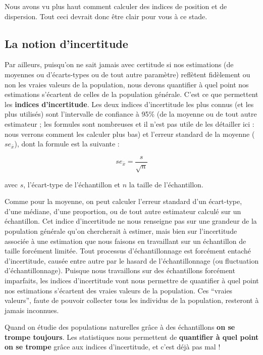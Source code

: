 \documentclass[
  a4paper,
  DIV=11,
  numbers=noendperiod,
  oneside]{scrreprt}
\begin{document}
Nous avons vu plus haut comment calculer des indices de position et de
dispersion. Tout ceci devrait donc être clair pour vous à ce stade.

\hypertarget{la-notion-dincertitude}{%
\subsection{La notion d'incertitude}\label{la-notion-dincertitude}}

Par ailleurs, puisqu'on ne sait jamais avec certitude si nos estimations
(de moyennes ou d'écarts-types ou de tout autre paramètre) reflètent
fidèlement ou non les vraies valeurs de la population, nous devons
quantifier à quel point nos estimations s'écartent de celles de la
population générale. C'est ce que permettent les \textbf{indices
d'incertitude}. Les deux indices d'incertitude les plus connus (et les
plus utilisés) sont l'intervalle de confiance à 95\% (de la moyenne ou
de tout autre estimateur ; les formules sont nombreuses et il n'est pas
utile de les détailler ici : nous verrons comment les calculer plus bas)
et l'erreur standard de la moyenne (\(se_{\bar{x}}\)), dont la formule
est la suivante :

\[se_{\bar{x}} = \frac{s}{\sqrt{n}}\]

avec \(s\), l'écart-type de l'échantillon et \(n\) la taille de
l'échantillon.

Comme pour la moyenne, on peut calculer l'erreur standard d'un
écart-type, d'une médiane, d'une proportion, ou de tout autre estimateur
calculé sur un échantillon. Cet indice d'incertitude ne nous renseigne
pas sur une grandeur de la population générale qu'on chercherait à
estimer, mais bien sur l'incertitude associée à une estimation que nous
faisons en travaillant sur un échantillon de taille forcément limitée.
Tout processus d'échantillonnage est forcément entaché d'incertitude,
causée entre autre par le hasard de l'échantillonnage (ou fluctuation
d'échantillonnage). Puisque nous travaillons sur des échantillons
forcément imparfaits, les indices d'incertitude vont nous permettre de
quantifier à quel point nos estimations s'écartent des vraies valeurs de
la population. Ces ``vraies valeurs'', faute de pouvoir collecter tous
les individus de la population, resteront à jamais inconnues.

\begin{tcolorbox}[enhanced jigsaw, colbacktitle=quarto-callout-important-color!10!white, opacityback=0, titlerule=0mm, leftrule=.75mm, bottomtitle=1mm, colframe=quarto-callout-important-color-frame, title=\textcolor{quarto-callout-important-color}{\faExclamation}\hspace{0.5em}{Autrement dit\ldots{}}, bottomrule=.15mm, opacitybacktitle=0.6, colback=white, rightrule=.15mm, breakable, toptitle=1mm, arc=.35mm, toprule=.15mm, left=2mm, coltitle=black]
Quand on étudie des populations naturelles grâce à des échantillons
\textbf{on se trompe toujours}. Les statistiques nous permettent de
\textbf{quantifier à quel point on se trompe} grâce aux indices
d'incertitude, et c'est déjà pas mal !
\end{tcolorbox}
\end{document}
